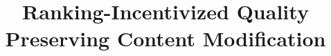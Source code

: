 \documentclass[sigconf]{acmart}
\begin{document}
\title{Ranking-Incentivized Quality Preserving Content Modification}



\maketitle






\appendix

\clearpage
\newpage
\balance


\end{document}
